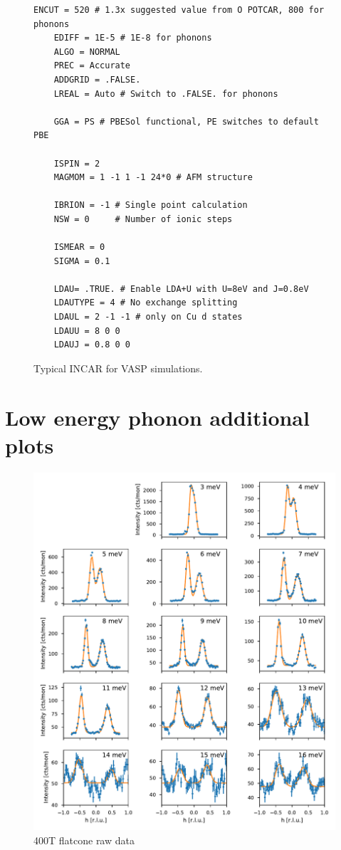 \begin{figure}
    \centering
    \begin{lstlisting}[basicstyle=\footnotesize\ttfamily, frame=single]
    ENCUT = 520 # 1.3x suggested value from O POTCAR, 800 for phonons
    EDIFF = 1E-5 # 1E-8 for phonons
    ALGO = NORMAL
    PREC = Accurate
    ADDGRID = .FALSE.
    LREAL = Auto # Switch to .FALSE. for phonons
    
    GGA = PS # PBESol functional, PE switches to default PBE
    
    ISPIN = 2
    MAGMOM = 1 -1 1 -1 24*0 # AFM structure
    
    IBRION = -1 # Single point calculation
    NSW = 0     # Number of ionic steps
    
    ISMEAR = 0
    SIGMA = 0.1
    
    LDAU= .TRUE. # Enable LDA+U with U=8eV and J=0.8eV
    LDAUTYPE = 4 # No exchange splitting
    LDAUL = 2 -1 -1 # only on Cu d states
    LDAUU = 8 0 0 
    LDAUJ = 0.8 0 0
    \end{lstlisting}
    \caption[VASP: Typical INCAR]{Typical INCAR for VASP simulations.}
    \label{fig:incar}
\end{figure}

\chapter{Low energy phonon additional plots}\label{app:lowen_plots}

\begin{figure}
    \centering
    \includegraphics[width=\textwidth]{fig/lowen/fits_400T.pdf}
    \caption[400T flatcone raw data]{400T flatcone raw data}
\end{figure}

